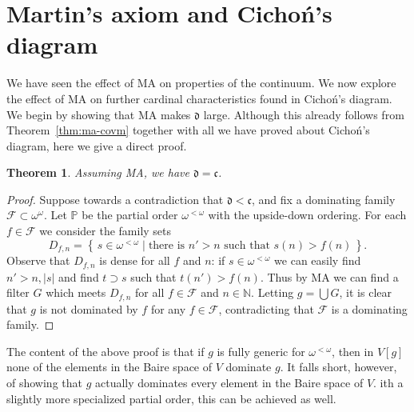 \documentclass[11pt,oneside]{amsbook}
\newcommand{\set}[1]{\left\{\,#1\,\right\}}
\newcommand{\NN}{\mathbb N}
\newcommand{\PP}{\mathbb P}
\theoremstyle{definition}
\theoremstyle{plain}
\newtheorem{thm}{Theorem}[section]
\theoremstyle{definition}
\theoremstyle{remark}
\numberwithin{equation}{section}
\numberwithin{figure}{section}
\begin{document}



\section{Martin's axiom and Cicho\'n's diagram}

We have seen the effect of MA on properties of the continuum. We now explore the effect of MA on further cardinal characteristics found in Cicho\'n's diagram. We begin by showing that MA makes $\mathfrak d$ large. Although this already follows from Theorem~\ref{thm:ma-covm} together with all we have proved about Cicho\'n's diagram, here we give a direct proof.

\begin{thm}
  \label{thm:ma-d}
  Assuming MA, we have $\mathfrak d=\mathfrak c$.
\end{thm}

\begin{proof}
  Suppose towards a contradiction that $\mathfrak d<\mathfrak c$, and fix a dominating family $\mathcal F\subset\omega^\omega$. Let $\PP$ be the partial order $\omega^{<\omega}$ with the upside-down ordering. For each $f\in\mathcal F$ we consider the family sets
  \[D_{f,n}=\set{s\in\omega^{<\omega}\mid\text{there is $n'>n$ such that $s(n)>f(n)$}}\text{.}
  \]
  Observe that $D_{f,n}$ is dense for all $f$ and $n$: if $s\in\omega^{<\omega}$ we can easily find $n'>n,|s|$ and find $t\supset s$ such that $t(n')>f(n)$. Thus by MA we can find a filter $G$ which meets $D_{f,n}$ for all $f\in\mathcal F$ and $n\in\NN$. Letting $g=\bigcup G$, it is clear that $g$ is not dominated by $f$ for any $f\in\mathcal F$, contradicting that $\mathcal F$ is a dominating family.
\end{proof}

The content of the above proof is that if $g$ is fully generic for $\omega^{<\omega}$, then in $V[g]$ none of the elements in the Baire space of $V$ dominate $g$. It falls short, however, of showing that $g$ actually dominates every element in the Baire space of $V$. ith a slightly more specialized partial order, this can be achieved as well.
\end{document}
